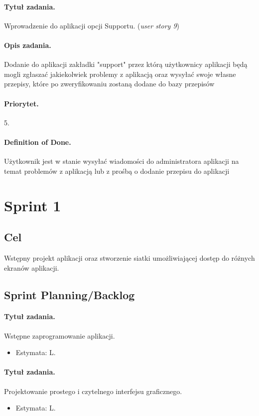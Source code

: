 \documentclass[a4paper]{article}
\begin{document}
\paragraph{Tytuł zadania.} Wprowadzenie do aplikacji opcji Supportu. (\textit{user story 9})
\paragraph{Opis zadania.} Dodanie do aplikacji zakładki "support" przez którą użytkownicy aplikacji będą mogli zgłaszać jakiekolwiek problemy z aplikacją oraz wysyłać swoje własne przepisy, które po zweryfikowaniu zostaną dodane do bazy przepisów
\paragraph{Priorytet.} 5.
\paragraph{Definition of Done.} Użytkownik jest w stanie wysyłać wiadomości do administratora aplikacji na temat problemów z aplikacją lub z prośbą o dodanie przepisu do aplikacji


\section{Sprint 1}
\subsection{Cel} Wstępny projekt aplikacji oraz stworzenie siatki umożliwiającej dostęp do różnych ekranów aplikacji.
\subsection{Sprint Planning/Backlog}

\paragraph{Tytuł zadania.} Wstępne zaprogramowanie aplikacji.
\begin{itemize}
	\item Estymata: L.
\end{itemize}

\paragraph{Tytuł zadania.} Projektowanie prostego i czytelnego interfejsu graficznego.
\begin{itemize}
	\item Estymata: L.
\end{itemize}
\end{document}

